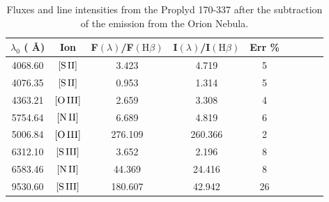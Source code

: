 \documentclass[fleqn,usenatbib]{mnras}
\begin{document}
\begin{table}
\caption{Fluxes and line intensities from the Proplyd 170-337 after the subtraction of the emission from the Orion Nebula.} 
\label{tab:fluxes_proplyd}
\begin{tabular}{ccccccccc} 
\hline
$\lambda_0$ ( \AA ) & Ion & F$\left( \lambda \right)$/F$\left( \mbox{H}\beta \right)$ & I$\left( \lambda \right)$/I$\left( \mbox{H}\beta \right)$ & Err \% \\
\hline
4068.60 & $\mbox{[S}\thinspace \mbox{II]}$ & 3.423 & 4.719 & 5  \\
4076.35 & $\mbox{[S}\thinspace \mbox{II]}$ & 0.953 & 1.314 & 5  \\
4363.21 & $\mbox{[O}\thinspace \mbox{III]}$ & 2.659 & 3.308 & 4 \\
5754.64 & $\mbox{[N}\thinspace \mbox{II]}$ & 6.689 & 4.819 & 6 &  \\
5006.84 & $\mbox{[O}\thinspace \mbox{III]}$ & 276.109 & 260.366 & 2 \\
6312.10 & $\mbox{[S}\thinspace \mbox{III]}$ & 3.652 & 2.196 & 8 &  \\
6583.46 & $\mbox{[N}\thinspace \mbox{II]}$ & 44.369 & 24.416 & 8 &  \\
9530.60 & $\mbox{[S}\thinspace \mbox{III]}$ & 180.607 & 42.942 & 26 \\
\hline
\end{tabular}
\end{table}




\bsp	%
\label{lastpage}
\end{document}
